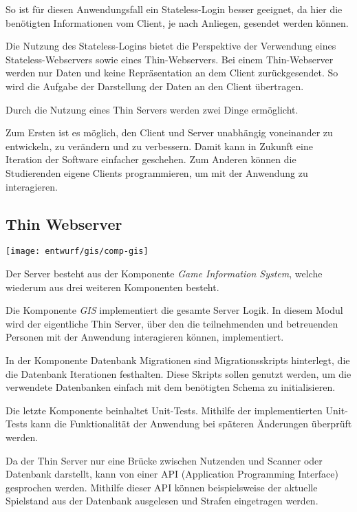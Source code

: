 So ist für diesen Anwendungsfall ein Stateless-Login besser geeignet, da hier die benötigten Informationen vom Client, je nach Anliegen, gesendet werden können. 

Die Nutzung des Stateless-Logins bietet die Perspektive der Verwendung eines Stateless-\linebreak Webservers sowie eines Thin-Webservers. Bei einem Thin-Webserver werden nur Daten und keine Repräsentation an dem Client zurückgesendet. So wird die Aufgabe der Darstellung der Daten an den Client übertragen.

Durch die Nutzung eines Thin Servers werden zwei Dinge ermöglicht. 

Zum Ersten ist es möglich, den Client und Server unabhängig voneinander zu entwickeln, zu verändern und zu verbessern. Damit kann in Zukunft eine Iteration der Software einfacher geschehen. Zum Anderen können die Studierenden eigene Clients programmieren, um mit der Anwendung zu interagieren.

\subsection{Thin Webserver}
\begin{center}
	\texttt{[image: entwurf/gis/comp-gis]}
\end{center}

Der Server besteht aus der Komponente \textit{Game Information System}, welche wiederum aus drei weiteren Komponenten besteht. 

Die Komponente \textit{GIS} implementiert die gesamte Server Logik. In diesem Modul wird der eigentliche Thin Server, über den die teilnehmenden und betreuenden Personen mit der Anwendung interagieren können, implementiert.

In der Komponente Datenbank Migrationen sind Migrationsskripts hinterlegt, die die Datenbank Iterationen festhalten. Diese Skripts sollen genutzt werden, um die verwendete Datenbanken einfach mit dem benötigten Schema zu initialisieren. 

Die letzte Komponente beinhaltet Unit-Tests. Mithilfe der implementierten Unit-Tests kann die Funktionalität der Anwendung bei späteren Änderungen überprüft werden.

Da der Thin Server nur eine Brücke zwischen Nutzenden und Scanner oder Datenbank darstellt, kann von einer API (Application Programming Interface) gesprochen werden. Mithilfe dieser API können beispielsweise der aktuelle Spielstand aus der Datenbank ausgelesen und Strafen eingetragen werden.

